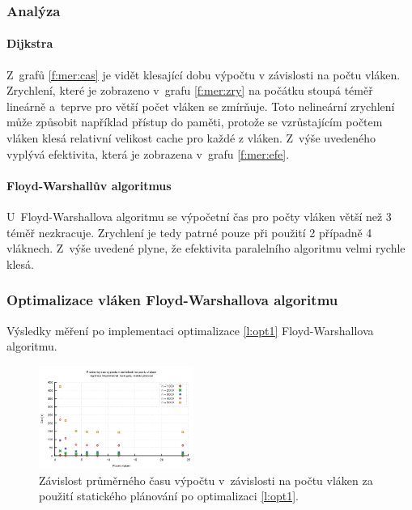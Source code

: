 \subsubsection{Analýza}
\paragraph{Dijkstra}
Z~grafů \ref{f:mer:cas} je vidět klesající dobu výpočtu v závislosti na počtu vláken.
Zrychlení, které je zobrazeno v~grafu \ref{f:mer:zry} na počátku stoupá téměř lineárně a~teprve pro větší počet vláken 
se zmírňuje. Toto nelineární zrychlení může způsobit například přístup do paměti, protože se vzrůstajícím počtem vláken klesá 
relativní velikost cache pro každé z vláken.
Z~výše uvedeného vyplývá efektivita, která je zobrazena v~grafu \ref{f:mer:efe}.

\paragraph{Floyd-Warshallův algoritmus}
U~Floyd-Warshallova algoritmu se výpočetní čas pro počty vláken větší než 3 téměř nezkracuje. 
Zrychlení je tedy patrné pouze při použití 2 případně 4 vláknech. Z~výše uvedené plyne, že efektivita paralelního algoritmu velmi rychle klesá.

\subsubsection{Optimalizace vláken Floyd-Warshallova algoritmu} \label{l:mer:opt1}
Výsledky měření po implementaci optimalizace \ref{l:opt1} Floyd-Warshallova algoritmu.

\begin{figure}
    \centering
    \includegraphics[width=0.45\textwidth]{../grafy/02_openMP/02-01-Floyd_cas_v2}
    \caption{Závislost průměrného času výpočtu v~závislosti na počtu vláken za použití statického plánování po optimalizaci \ref{l:opt1}.}
    \label{f:mer:cas:opt1}
\end{figure}

